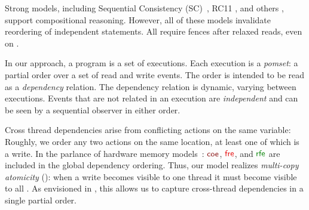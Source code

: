 

Strong models, including Sequential Consistency
(SC)~\citep{Lamport:1979:MMC:1311099.1311750}, RC11
\citep{DBLP:conf/pldi/LahavVKHD17}, and others
\citep{Dolan:2018:BDR:3192366.3192421,DBLP:conf/pldi/LahavVKHD17,DBLP:conf/lics/JeffreyR16,Boehm:2014:OGA:2618128.2618134},
support compositional reasoning.  However, all of these models invalidate
reordering of independent statements.  All require fences after relaxed
reads, even on \armeight.



In our approach, a program is a set of executions.  Each execution is a
\emph{pomset}: a partial order over a set of read and write events.  The
order is intended to be read as a \emph{dependency} relation.  The dependency
relation is dynamic, varying between executions.  Events that are not related
in an execution are \emph{independent} and can be seen by a sequential
observer in either order.

Cross thread dependencies arise from conflicting actions on the same
variable: Roughly, we order any two actions on the same location, at least
one of which is a write.  In the parlance of hardware memory
models~\citep{alglave}: $\rcoe$, $\rfre$, and $\rrfex$ are included in the
global dependency ordering.  Thus, our model realizes \emph{multi-copy
  atomicity} (\mca): when a write becomes visible to one thread it must
become visible to all
\citep{DBLP:journals/pacmpl/PulteFDFSS18}.  As envisioned in
\cite[]{AlglaveThesis}, this allows us to capture cross-thread
dependencies in a single partial order.

